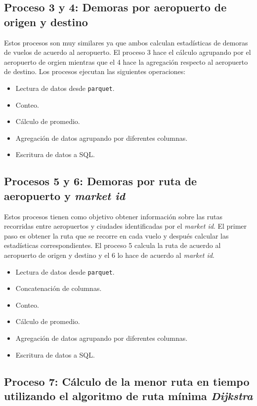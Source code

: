 \subsection{Proceso 3 y 4: Demoras por aeropuerto de origen y destino}

Estos procesos son muy similares ya que ambos calculan estadísticas de demoras de vuelos de acuerdo al aeropuerto. El proceso 3 hace el cálculo agrupando por el aeropuerto de orgien mientras que el 4 hace la agregación respecto al aeropuerto de destino. Los procesos ejecutan las siguientes operaciones:

\begin{itemize}
	\item Lectura de datos desde \texttt{parquet}.
	\item Conteo.
	\item Cálculo de promedio.
	\item Agregación de datos agrupando por diferentes columnas.
	\item Escritura de datos a SQL.
\end{itemize}

\subsection{Procesos 5 y 6: Demoras por ruta de aeropuerto y \textit{market id}}

Estos procesos tienen como objetivo obtener información sobre las rutas recorridas entre aeropuertos y ciudades identificadas por el \textit{market id}. El primer paso es obtener la ruta que se recorre en cada vuelo y después calcular las estadísticas correspondientes. El proceso 5 calcula la ruta de acuerdo al aeropuerto de origen y destino y el 6 lo hace de acuerdo al \textit{market id}.

\begin{itemize}
	\item Lectura de datos desde \texttt{parquet}.
	\item Concatenación de columnas.
	\item Conteo.
	\item Cálculo de promedio.
	\item Agregación de datos agrupando por diferentes columnas.
	\item Escritura de datos a SQL.
\end{itemize}

\subsection{Proceso 7: Cálculo de la menor ruta en tiempo utilizando el algoritmo de ruta mínima \textit{Dijkstra}}

